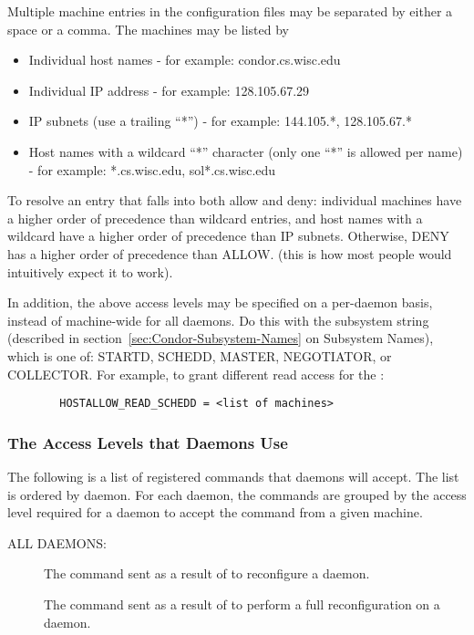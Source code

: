 Multiple machine entries
in the configuration files
may be separated by either a space or a comma.
The machines may be listed by

\begin{itemize}
\item Individual host names - for example: condor.cs.wisc.edu
\item Individual IP address - for example: 128.105.67.29
\item IP subnets (use a trailing ``*'') - for example: 144.105.*, 128.105.67.*
\item Host names with a wildcard ``*'' character (only one ``*'' is
    allowed per name) - for example: *.cs.wisc.edu, sol*.cs.wisc.edu
\end{itemize}

To resolve an entry that falls into both allow and deny:
individual
machines have a higher order of precedence than wildcard entries, and
host names with a wildcard have a higher order of precedence than IP
subnets.
Otherwise, DENY has a higher order of precedence than ALLOW.
(this is how most people would intuitively expect it to work).  

In addition, the above access levels may be specified on a
per-daemon basis, instead of machine-wide for all daemons.
Do this with the subsystem string (described in
section~\ref{sec:Condor-Subsystem-Names} on Subsystem Names),
which is one of: STARTD, SCHEDD, MASTER, NEGOTIATOR,
or COLLECTOR.
For example, to grant different read access for the :
\begin{verbatim}
        HOSTALLOW_READ_SCHEDD = <list of machines>
\end{verbatim}

\subsubsection{\label{sec:DCPerm-per-Daemon}The Access Levels that Daemons
Use} 

The following is a list of registered commands that daemons will
accept.  The list is ordered by daemon.
For each daemon, the commands are grouped by the access level
required for a daemon to accept the command from a
given machine.

ALL DAEMONS:

\begin{description}
\item[]

  The command sent as a result of  to reconfigure a daemon.

\item[]

  The command sent as a result of 
  to perform a full reconfiguration on a daemon. 
\end{description}

